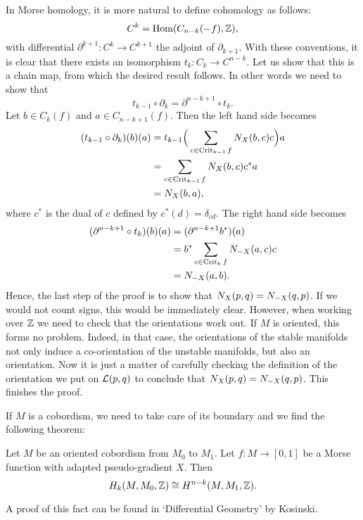 \begin{myproof}
    In Morse homology, it is more natural to define cohomology as follows:
    \[
        C^{k} = \operatorname{Hom}(C_{n-k}(-f), \mathbb{Z})
    ,\]
    with differential $\partial^{k+1}:C^{k} \to  C^{k+1}$ the adjoint of $\partial_{k+1}$.
    With these conventions, it is clear that there exists an isomorphism $t_k: C_k \to  C^{n-k}$. 
    Let us show that this is a chain map, from which the desired result follows.
    In other words we need to show that
    \[
    t_{k-1}  \circ  \partial_k = \partial^{n-k+1}  \circ  t_k
    .\] 
    Let $b \in C_k(f)$ and $a \in C_{n-k+1}(f)$.
    Then the left hand side becomes
    \begin{align*}
        (t_{k-1}  \circ  \partial_k)(b)(a)
        &= t_{k-1}\Big(\sum_{c \in \operatorname{Crit}_{k-1}f} N_{X}(b, c) c\Big) a \\
        &= \sum_{c \in \operatorname{Crit}_{k-1}f} N_{X}(b, c) c^{*} a\\
        &= N_{X}(b, a)
    ,\end{align*} 
    where $c^{*}$ is the dual of $c$ defined by $c^{*}(d) = \delta_{cd}$.
    The right hand side becomes
    \begin{align*}
        (\partial^{n-k+1}  \circ  t_k)(b)(a) &= (\partial^{n-k+1}  b^{*})(a)\\
                                          &= b^{*} \sum_{c \in \operatorname{Crit}_k f} N_{-X}(a, c) c\\
                                          &= N_{-X}(a, b)
    .\end{align*} 
    Hence, the last step of the proof is to show that $N_{X}(p, q) = N_{-X}(q, p)$.
    If we would not count signs, this would be immediately clear.
    However, when working over $\mathbb{Z}$ we need to check that the orientations work out.
    If $M$ is oriented, this forms no problem.
    Indeed, in that case, the orientations of the stable manifolds not only induce a co-orientation of the unstable manifolds, but also an orientation.
    Now it is just a matter of carefully checking the definition of the orientation we put on $\mathcal L(p, q)$ to conclude that $N_{X}(p, q) = N_{-X}(q, p)$.
    This finishes the proof.
\end{myproof}

If $M$ is a cobordism, we need to take care of its boundary and we find the following theorem:
\begin{theorem}
    Let $M$ be an oriented cobordism from  $M_0$ to $M_1$.
    Let $f: M \to  [0,1]$ be a Morse function with adapted pseudo-gradient $X$.
    Then
     \[
         H_k(M, M_0, \mathbb{Z}) \cong H^{n-k}(M, M_1, \mathbb{Z})
    .\] 
\end{theorem}
A proof of this fact can be found in `Differential Geometry' by Kosinski.


